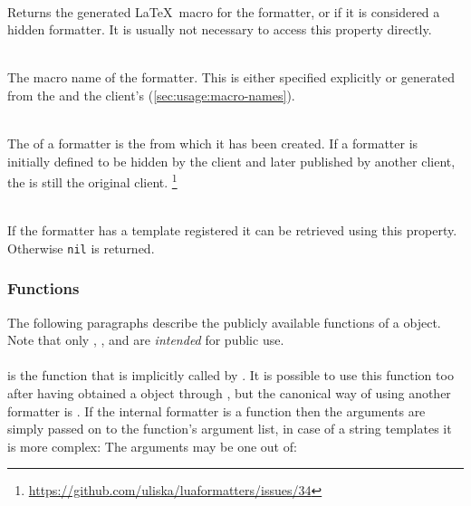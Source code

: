 \documentclass[12pt]{scrartcl}
\begin{document}
\begin{itemize*}
\item {}\\
Returns the generated \LaTeX\ macro for the formatter, or  if it is
considered a hidden formatter.  It is usually not necessary to access this
property directly.

\item {}\\
The macro name of the formatter.  This is either specified explicitly or
generated from the  and the client's 
(\vref{sec:usage:macro-names}).

\item {}\\
The  of a formatter is the  from which it has been
created.  If a formatter is initially defined to be hidden by the client and
later published by another client, the  is still the original
client.%
\footnote{ \url{https://github.com/uliska/luaformatters/issues/34}}


\item {}\\
If the formatter has a template registered it can be retrieved using this
property.  Otherwise \texttt{nil} is returned.
\end{itemize*}


\subsubsection{ Functions}
\label{sec:advanced:formatter-functions}

The following paragraphs describe the publicly available functions of a
 object.  Note that only ,
,  and  are
\emph{intended} for public use.


\paragraph{}
\label{sec:advanced:formatter:apply}

is the function that is implicitly called by .  It is
possible to use this function too after having obtained a 
object through , but the canonical way of using
another formatter is .  If the internal formatter
is a function then the  arguments are simply passed on to the
function's argument list, in case of a string templates it is more complex: The
arguments may be one out of:
\end{document}
